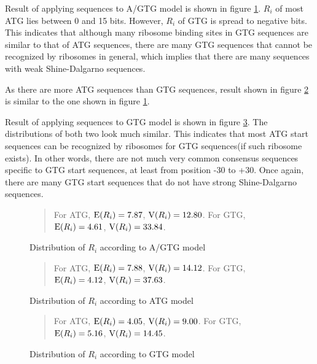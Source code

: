 Result of applying sequences to A/GTG model is shown in figure
\ref{agtg_model}. \(R_{i}\) of most ATG lies between 0 and
15 bits. However, \(R_{i}\) of GTG is spread to negative bits.
This indicates that although many ribosome binding sites in GTG
sequences are similar to that of ATG sequences, there are many GTG
sequences that cannot be recognized by ribosomes in general, which
implies that there are many sequences with weak Shine-Dalgarno
sequences. 

As there are more ATG sequences than GTG sequences, result shown in
figure \ref{atg_model} is similar to the one shown in figure
\ref{agtg_model}. 

Result of applying sequences to GTG model is shown in figure
\ref{gtg_model}. The distributions of both two look much similar.
This indicates that most ATG start sequences can be recognized by ribosomes
for GTG sequences(if such ribosome exists). In other words, 
there are not much very common consensus sequences specific to GTG start
sequences, at least from position -30 to +30. Once again, there are
many GTG start sequences that do not have strong Shine-Dalgarno
sequences. 

\begin{figure}
\begin{center}
\end{center}
\caption{Distribution of \(R_{i}\) according to A/GTG model}
\label{agtg_model}
\begin{quotation}
For ATG, \({\rm E}(R_{i}) = 7.87\), \({\rm V}(R_{i}) = 12.80\).
For GTG, \({\rm E}(R_{i}) = 4.61\), \({\rm V}(R_{i}) = 33.84\).
\end{quotation}
\end{figure}
\begin{figure}
\begin{center}
\end{center}
\caption{Distribution of \(R_{i}\) according to ATG model}
\label{atg_model}
\begin{quotation}
For ATG, \({\rm E}(R_{i}) = 7.88\), \({\rm V}(R_{i}) = 14.12\).
For GTG, \({\rm E}(R_{i}) = 4.12\), \({\rm V}(R_{i}) = 37.63\).
\end{quotation}
\end{figure}
\begin{figure}
\begin{center}
\end{center}
\caption{Distribution of \(R_{i}\) according to GTG model}
\label{gtg_model}
\begin{quotation}
For ATG, \({\rm E}(R_{i}) = 4.05\), \({\rm V}(R_{i}) = 9.00\).
For GTG, \({\rm E}(R_{i}) = 5.16\), \({\rm V}(R_{i}) = 14.45\).
\end{quotation}
\end{figure}

